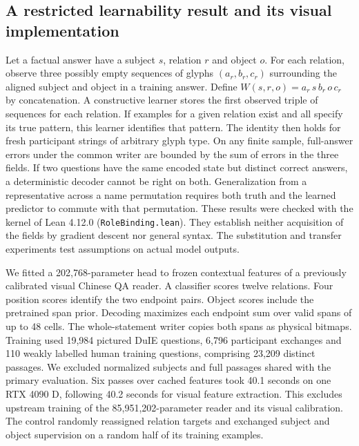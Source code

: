 \documentclass[12pt,a4paper]{article}
\providecommand{\DIFadd}[1]{{\protect\color{blue} \sf #1}} %
\begin{document}
\subsection*{\DIFadd{A restricted learnability result and its visual implementation}}
\DIFadd{Let a factual answer have a subject $s$, relation $r$ and object $o$. For each relation, observe three possibly empty sequences of glyphs $(a_r,b_r,c_r)$ surrounding the aligned subject and object in a training answer. Define $W(s,r,o)=a_r\,s\,b_r\,o\,c_r$ by concatenation. A constructive learner stores the first observed triple of sequences for each relation. If examples for a given relation exist and all specify its true pattern, this learner identifies that pattern. The identity then holds for fresh participant strings of arbitrary glyph type. On any finite sample, full-answer errors under the common writer are bounded by the sum of errors in the three fields. If two questions have the same encoded state but distinct correct answers, a deterministic decoder cannot be right on both. Generalization from a representative across a name permutation requires both truth and the learned predictor to commute with that permutation. These results were checked with the kernel of Lean 4.12.0 (\texttt{RoleBinding.lean}). They establish neither acquisition of the fields by gradient descent nor general syntax. The substitution and transfer experiments test assumptions on actual model outputs.
}

\DIFadd{We fitted a 202,768-parameter head to frozen contextual features of a previously calibrated visual Chinese QA reader. A classifier scores twelve relations. Four position scores identify the two endpoint pairs. Object scores include the pretrained span prior. Decoding maximizes each endpoint sum over valid spans of up to 48 cells. The whole-statement writer copies both spans as physical bitmaps. Training used 19,984 pictured DuIE questions, 6,796 participant exchanges and 110 weakly labelled human training questions, comprising 23,209 distinct passages. We excluded normalized subjects and full passages shared with the primary evaluation. Six passes over cached features took 40.1 seconds on one RTX 4090 D, following 40.2 seconds for visual feature extraction. This excludes upstream training of the 85,951,202-parameter reader and its visual calibration. The control randomly reassigned relation targets and exchanged subject and object supervision on a random half of its training examples.
}
\end{document}
